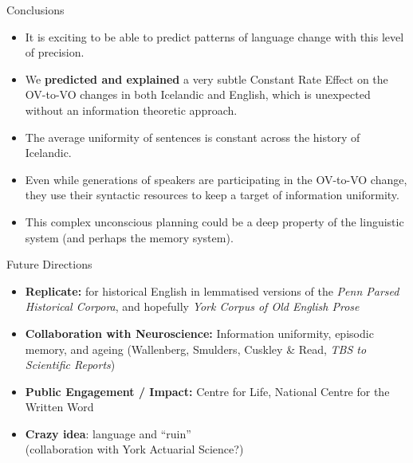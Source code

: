 \documentclass[hyperref={pdfpagelabels=false}]{beamer}
\begin{document}
\begin{frame}{Conclusions} 
	
	
	\begin{itemize}
		\item It is exciting to be able to predict patterns of language change with this level of precision.\pause
		\item We \textbf{predicted and explained} a very subtle Constant Rate Effect on the OV-to-VO changes in both Icelandic and English, which is unexpected without an information theoretic approach.\pause
		\item The average uniformity of sentences is constant across the history of Icelandic.\pause
		\item Even while generations of speakers are participating in the OV-to-VO change, they use their syntactic resources to keep a target of information uniformity.\pause
		\item This complex unconscious planning could be a deep property of the linguistic system (and perhaps the memory system).
	\end{itemize}
	
\end{frame}


\begin{frame}{Future Directions} 
	
	
	\begin{itemize}
		\item \textbf{Replicate:} for historical English in lemmatised versions of the \textsl{Penn Parsed Historical Corpora}, and hopefully \textsl{York Corpus of Old English Prose} \citep{ycoe}\pause
		\item \textbf{Collaboration with Neuroscience:} Information uniformity, episodic memory, and ageing (Wallenberg, Smulders, Cuskley \& Read, \textsl{TBS to Scientific Reports})\pause
	\item \textbf{Public Engagement / Impact:} Centre for Life, National Centre for the Written Word\pause
		\item \textbf{Crazy idea}: language and ``ruin''\\ (collaboration with York Actuarial Science?)
	\end{itemize}
	
\end{frame}
\end{document}
